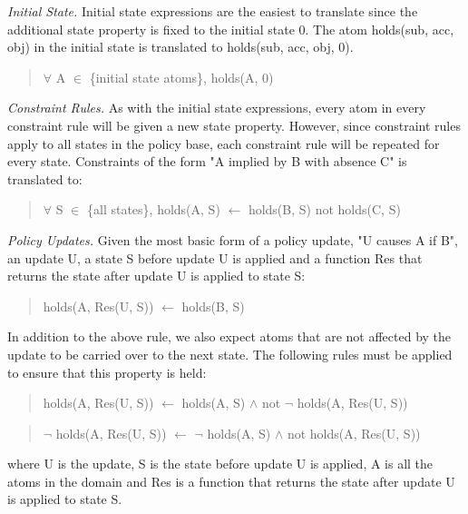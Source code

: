 \documentclass{llncs}
\begin{document}
        \emph{Initial State.} Initial state expressions are the easiest to
        translate since the additional state property is fixed to the initial
        state 0. The atom holds(sub, acc, obj) in the initial state is
        translated to holds(sub, acc, obj, 0).

        \begin{quote}
          $\forall$ A $\in$ \{initial state atoms\}, holds(A, 0)
        \end{quote}

        \emph{Constraint Rules.} As with the initial state expressions, every
        atom in every constraint rule will be given a new state property.
        However, since constraint rules apply to all states in the policy
        base, each constraint rule will be repeated for every state.
        Constraints of the form "A implied by B with absence C" is translated
        to:

        \begin{quote}
          $\forall$ S $\in$ \{all states\},
          holds(A, S) $\leftarrow$ holds(B, S) not holds(C, S)
        \end{quote}

        \emph{Policy Updates.} Given the most basic form of a policy update,
        "U causes A if B", an update U, a state S before update U is applied
        and a function Res that returns the state after update U is applied
        to state S:

        \begin{quote}
          holds(A, Res(U, S)) $\leftarrow$ holds(B, S)
        \end{quote}
 
        In addition to the above rule, we also expect atoms that are not
        affected by the update to be carried over to the next state. The 
        following rules must be applied to ensure that this property is
        held:

        \begin{quote}
          holds(A, Res(U, S)) $\leftarrow$ holds(A, S) $\land$ not $\lnot$
          holds(A, Res(U, S))
        \end{quote}
        \begin{quote}
          $\lnot$ holds(A, Res(U, S)) $\leftarrow$ $\lnot$ holds(A, S) $\land$
          not holds(A, Res(U, S))
        \end{quote}

        where U is the update, S is the state before update U is applied, A is 
        all the atoms in the domain and Res is a function that returns the
        state after update U is applied to state S.
\end{document}
